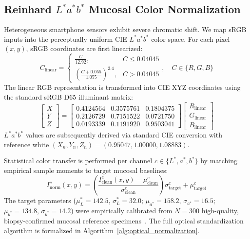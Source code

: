 \documentclass[journal]{IEEEtran}
\begin{document}
\subsection{Reinhard $L^*a^*b^*$ Mucosal Color Normalization}
Heterogeneous smartphone sensors exhibit severe chromatic shift. We map sRGB inputs into the perceptually uniform CIE $L^*a^*b^*$ color space. For each pixel $(x, y)$, sRGB coordinates are first linearized:
\begin{equation}
C_{\text{linear}} = \begin{cases} \frac{C}{12.92}, & C \le 0.04045 \\ \left(\frac{C + 0.055}{1.055}\right)^{2.4}, & C > 0.04045 \end{cases}, \quad C \in \{R, G, B\}
\end{equation}
The linear RGB representation is transformed into CIE XYZ coordinates using the standard sRGB D65 illuminant matrix:
\begin{equation}
\begin{bmatrix} X \\ Y \\ Z \end{bmatrix} = \begin{bmatrix} 0.4124564 & 0.3575761 & 0.1804375 \\ 0.2126729 & 0.7151522 & 0.0721750 \\ 0.0193339 & 0.1191920 & 0.9503041 \end{bmatrix} \begin{bmatrix} R_{\text{linear}} \\ G_{\text{linear}} \\ B_{\text{linear}} \end{bmatrix}
\end{equation}
$L^*a^*b^*$ values are subsequently derived via standard CIE conversion with reference white $(X_n, Y_n, Z_n) = (0.95047, 1.00000, 1.08883)$.

Statistical color transfer is performed per channel $c \in \{L^*, a^*, b^*\}$ by matching empirical sample moments to target mucosal baselines:
\begin{equation}
I_{\text{norm}}^c(x, y) = \left( \frac{I_{\text{clean}}^c(x, y) - \mu_{\text{clean}}^c}{\sigma_{\text{clean}}^c} \right) \sigma_{\text{target}}^c + \mu_{\text{target}}^c
\label{eq:reinhard}
\end{equation}
The target parameters ($\mu_L^* = 142.5$, $\sigma_L^* = 32.0$; $\mu_{a^*} = 158.2$, $\sigma_{a^*} = 16.5$; $\mu_{b^*} = 134.8$, $\sigma_{b^*} = 14.2$) were empirically calibrated from $N=300$ high-quality, biopsy-confirmed mucosal reference specimens~\cite{reinhard2001color}. The full optical standardization algorithm is formalized in Algorithm~\ref{alg:optical_normalization}.
\end{document}
